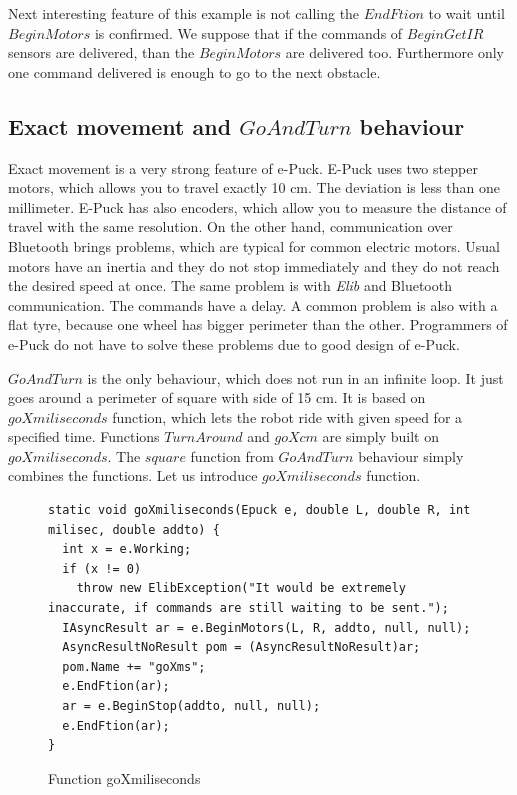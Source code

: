   Next interesting feature of this example is not calling the $EndFtion$ to wait until $BeginMotors$ is confirmed.
  We suppose that if the commands of $BeginGetIR$ sensors are delivered, than the $BeginMotors$ are delivered too.
  Furthermore only one command delivered is enough to go to the next obstacle.

\subsection{Exact movement and $GoAndTurn$ behaviour} \label{sec:go}
  Exact movement is a very strong feature of e-Puck. E-Puck uses two stepper motors,
  which allows you to travel exactly 10 cm. The deviation is less than one millimeter.
  E-Puck has also encoders, which allow you to measure the distance of travel with the same resolution.
  On the other hand, communication over Bluetooth brings problems, which are typical for common electric motors.
  Usual motors have an inertia and they do not stop immediately and they do not reach the desired speed at once. The same problem is with 
  {\it Elib} and Bluetooth communication. The commands have a delay.
  A common problem is also with a flat tyre, because one wheel has bigger perimeter than the other.
  Programmers of e-Puck do not have to solve these problems due to good design of e-Puck.

  $GoAndTurn$ is the only behaviour, which does not run in an infinite loop. 
  It just goes around a perimeter of square with side
  of 15 cm. It is based on $goXmiliseconds$ function, which lets the robot ride with given speed for a specified time.
  Functions $TurnAround$ and $goXcm$ are simply built on $goXmiliseconds$. The $square$ function from $GoAndTurn$ behaviour
  simply combines the functions.
  Let us introduce $goXmiliseconds$ function.
\begin{figure}[!hbp]
\begin{lstlisting}
static void goXmiliseconds(Epuck e, double L, double R, int milisec, double addto) {
  int x = e.Working;
  if (x != 0)
    throw new ElibException("It would be extremely inaccurate, if commands are still waiting to be sent.");
  IAsyncResult ar = e.BeginMotors(L, R, addto, null, null);
  AsyncResultNoResult pom = (AsyncResultNoResult)ar;
  pom.Name += "goXms";
  e.EndFtion(ar);
  ar = e.BeginStop(addto, null, null);
  e.EndFtion(ar);
}
\end{lstlisting}
\caption{Function goXmiliseconds} \label{gox}
\end{figure}

